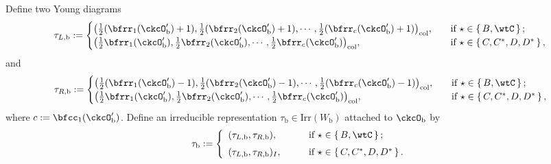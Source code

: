 \documentclass[12pt,a4paper]{amsart}
\numberwithin{equation}{section}
\theoremstyle{remark}
\def\half{{\tfrac{1}{2}}}
\def\Irr{\mathrm{Irr}}
\begin{document}
Define two Young diagrams
 \begin{equation}\label{eq:taub}
    \begin{split}
      \tau_{L,\mathrm b} := \begin{cases}
        \big(\half(\bfrr_{1}(\ckcO'_{\mathrm b})+1), \half(\bfrr_{2}(\ckcO'_{\mathrm b})+1), \cdots, \half(\bfrr_{c}(\ckcO'_{\mathrm b})+1)\big)_{\mathrm{col}},
               &\quad \text{if } \star \in \set{B,\wtC}; \\%
         \big(\half\bfrr_{1}(\ckcO'_{\mathrm b}), \half\bfrr_{2}(\ckcO'_{\mathrm b}),\cdots, \half\bfrr_{c}(\ckcO'_{\mathrm b})\big)_{\mathrm{col}},
        &\quad  \text{if } \star \in \set{C,C^{*}, D,D^{*}},\\
      \end{cases}
    \end{split}
  \end{equation}
  and
   \begin{equation}\label{eq:taub2}
    \begin{split}
      \tau_{R,\mathrm b} := \begin{cases}
        \big(\half(\bfrr_{1}(\ckcO'_{\mathrm b})-1), \half(\bfrr_{2}(\ckcO'_{\mathrm b})-1), \cdots, \half(\bfrr_{c}(\ckcO'_{\mathrm b})-1)\big)_{\mathrm{col}},
               &\quad \text{if } \star \in \set{B,\wtC}; \\%
         \big(\half\bfrr_{1}(\ckcO'_{\mathrm b}), \half\bfrr_{2}(\ckcO'_{\mathrm b}),\cdots, \half\bfrr_{c}(\ckcO'_{\mathrm b})\big)_{\mathrm{col}},
        &\quad  \text{if } \star \in \set{C,C^{*}, D,D^{*}},\\
      \end{cases}
    \end{split}
  \end{equation}
 where $c:= \bfcc_{1}(\ckcO'_{\mathrm b})$. Define an irreducible  representation $\tau_{\mathrm b}\in \Irr(W_{\mathrm b})$ attached to $\ckcO_{\mathrm b}$ by
\begin{equation}\label{eq:taub}
 \tau_{\mathrm b}:= \left\{
     \begin{array}{ll}
       ( \tau_{L,\mathrm b}, \tau_{R,\mathrm b}), \qquad
       & \text{if } \star \in \set{B,\wtC}; \medskip\\
         ( \tau_{L,\mathrm b}, \tau_{R,\mathrm b})_I, \qquad & \text{if } \star \in \set{C,C^{*}, D,D^{*}}.
\end{array}
  \right.
\end{equation}
\end{document}
